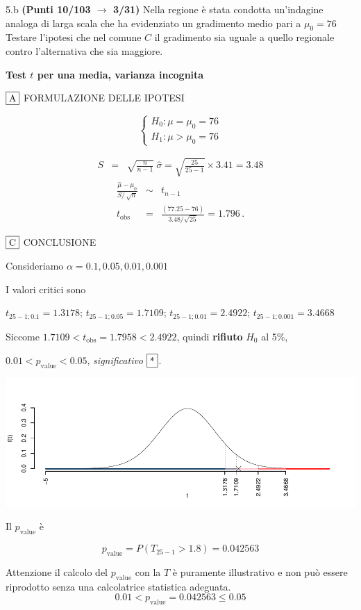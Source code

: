 \documentclass[
  11pt,
]{book}
\theoremstyle{mytheoremstyle}
\theoremstyle{mydefstyle}
\newenvironment{sol}
  {
  \begin{tcolorbox}[enhanced,breakable,arc=0.1mm,boxrule=1pt,colback=white,colframe=iblue,
  title=\bf \fontfamily{lmss}\selectfont \hspace{.5 cm} Soluzione,drop fuzzy shadow]

}{
\end{tcolorbox}
  }
\begin{document}
5.b \textbf{(Punti 10/103 \(\rightarrow\) 3/31)} Nella regione è stata condotta un'indagine analoga
di larga scala che ha evidenziato un gradimento medio pari a \(\mu_0=76\)
Testare l'ipotesi che nel comune \(C\) il gradimento sia uguale a quello regionale contro l'alternativa che sia maggiore.

\begin{sol}
\textbf{Test \(t\) per una media, varianza incognita}

\(\fbox{A}\) FORMULAZIONE DELLE IPOTESI

\[\begin{cases}
   H_0: \mu = \mu_0=76 \\
   H_1: \mu > \mu_0=76 
   \end{cases}\]

\begin{eqnarray*}
   S    &=& \sqrt{\frac{n} {n-1}}\ \widehat{\sigma} 
   =  \sqrt{\frac{ 25 } { 25 -1}} \times  3.41  =  3.48 
   \end{eqnarray*}
\begin{eqnarray*}
   \frac{\hat\mu - \mu_{0}} {S/\,\sqrt{n}}&\sim&t_{n-1}\\
   t_{\text{obs}}
   &=& \frac{ ( 77.25 -  76 )} { 3.48 /\sqrt{ 25 }}
   =   1.796 \, .
   \end{eqnarray*}

\(\fbox{C}\) CONCLUSIONE

Consideriamo \(\alpha=0.1, 0.05, 0.01, 0.001\)

I valori critici sono

\(t_{25-1;0.1}=1.3178\); \(t_{25-1;0.05}=1.7109\); \(t_{25-1;0.01}=2.4922\); \(t_{25-1;0.001}=3.4668\)

Siccome \(1.7109<t_\text{obs}=1.7958<2.4922\), quindi \textbf{rifiuto} \(H_0\) al 5\%,

\(0.01<p_\text{value}<0.05\), \emph{significativo} \(\fbox{*}\).

\begin{center}\includegraphics{Esami_passati_con_soluzioni_files/figure-latex/2023-81,-1} \end{center}

Il \(p_{\text{value}}\) è

\[ p_{\text{value}} = P(T_{25-1}>1.8)=0.042563 \]

Attenzione il calcolo del \(p_\text{value}\) con la \(T\) è puramente illustrativo e non può essere riprodotto senza una calcolatrice statistica adeguata.\[
 0.01 < p_\text{value}= 0.042563 \leq 0.05 
\]

\end{sol}
\end{document}
